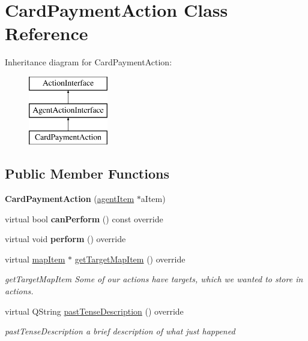\hypertarget{class_card_payment_action}{\section{Card\-Payment\-Action Class Reference}
\label{class_card_payment_action}
}
Inheritance diagram for Card\-Payment\-Action\-:\begin{figure}[H]
\begin{center}
\leavevmode
\includegraphics[height=3.000000cm]{class_card_payment_action}
\end{center}
\end{figure}
\subsection*{Public Member Functions}
\begin{DoxyCompactItemize}
\item 
\hypertarget{class_card_payment_action_a451ba754ccc41cdceb422a4a4b131312}{{\bfseries Card\-Payment\-Action} (\hyperlink{classagent_item}{agent\-Item} $\ast$a\-Item)}\label{class_card_payment_action_a451ba754ccc41cdceb422a4a4b131312}

\item 
\hypertarget{class_card_payment_action_ac8bc92ac610060b14e12ee4ca4dc5291}{virtual bool {\bfseries can\-Perform} () const override}\label{class_card_payment_action_ac8bc92ac610060b14e12ee4ca4dc5291}

\item 
\hypertarget{class_card_payment_action_a44b911c39d354a62c2caee88a8837a30}{virtual void {\bfseries perform} () override}\label{class_card_payment_action_a44b911c39d354a62c2caee88a8837a30}

\item 
virtual \hyperlink{classmap_item}{map\-Item} $\ast$ \hyperlink{class_card_payment_action_ac729bee3b4c5d89fd045c30da2fd4071}{get\-Target\-Map\-Item} () override
\begin{DoxyCompactList}\small\item\em get\-Target\-Map\-Item Some of our actions have targets, which we wanted to store in actions. \end{DoxyCompactList}\item 
virtual Q\-String \hyperlink{class_card_payment_action_a1ef5f7ef2034bc123de43107c70928ec}{past\-Tense\-Description} () override
\begin{DoxyCompactList}\small\item\em past\-Tense\-Description a brief description of what just happened \end{DoxyCompactList}\end{DoxyCompactItemize}


